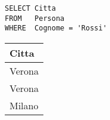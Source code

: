 \begin{lstlisting}
SELECT Citta
FROM   Persona
WHERE  Cognome = 'Rossi'
\end{lstlisting}

\begin{center}
	\begin{tabular}{@{} l @{}}
		\toprule
			Citta \\
		\midrule
			Verona \\
			Verona \\
			Milano \\
		\bottomrule
	\end{tabular}
\end{center}
